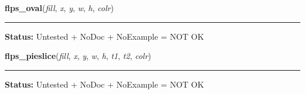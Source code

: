     \label{xformslib:library:flps_oval}

    \vspace{0.5ex}

\hspace{.8\funcindent}\begin{boxedminipage}{\funcwidth}

    \raggedright \textbf{flps\_oval}(\textit{fill}, \textit{x}, \textit{y}, \textit{w}, \textit{h}, \textit{colr})

    \vspace{-1.5ex}

    \rule{\textwidth}{0.5\fboxrule}
\setlength{\parskip}{2ex}
\setlength{\parskip}{1ex}
\textbf{Status:} Untested + NoDoc + NoExample = NOT OK



    \end{boxedminipage}

    \label{xformslib:library:flps_pieslice}

    \vspace{0.5ex}

\hspace{.8\funcindent}\begin{boxedminipage}{\funcwidth}

    \raggedright \textbf{flps\_pieslice}(\textit{fill}, \textit{x}, \textit{y}, \textit{w}, \textit{h}, \textit{t1}, \textit{t2}, \textit{colr})

    \vspace{-1.5ex}

    \rule{\textwidth}{0.5\fboxrule}
\setlength{\parskip}{2ex}
\setlength{\parskip}{1ex}
\textbf{Status:} Untested + NoDoc + NoExample = NOT OK



    \end{boxedminipage}

    \label{xformslib:library:flps_poly}

    \vspace{0.5ex}

